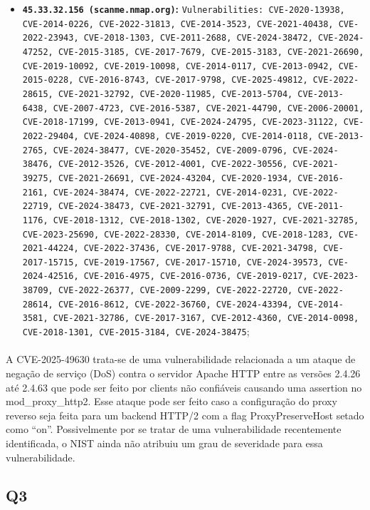 \documentclass[12pt]{article}
\begin{document}
\begin{itemize}
  \item \textbf{\texttt{45.33.32.156 (scanme.nmap.org)}:} \texttt{Vulnerabilities: CVE-2020-13938, CVE-2014-0226, CVE-2022-31813, CVE-2014-3523, CVE-2021-40438, CVE-2022-23943, CVE-2018-1303, CVE-2011-2688, CVE-2024-38472, CVE-2024-47252, CVE-2015-3185, CVE-2017-7679, CVE-2015-3183, CVE-2021-26690, CVE-2019-10092, CVE-2019-10098, CVE-2014-0117, CVE-2013-0942, CVE-2015-0228, CVE-2016-8743, CVE-2017-9798, CVE-2025-49812, CVE-2022-28615, CVE-2021-32792, CVE-2020-11985, CVE-2013-5704, CVE-2013-6438, CVE-2007-4723, CVE-2016-5387, CVE-2021-44790, CVE-2006-20001, CVE-2018-17199, CVE-2013-0941, CVE-2024-24795, CVE-2023-31122, CVE-2022-29404, CVE-2024-40898, CVE-2019-0220, CVE-2014-0118, CVE-2013-2765, CVE-2024-38477, CVE-2020-35452, CVE-2009-0796, CVE-2024-38476, CVE-2012-3526, CVE-2012-4001, CVE-2022-30556, CVE-2021-39275, CVE-2021-26691, CVE-2024-43204, CVE-2020-1934, CVE-2016-2161, CVE-2024-38474, CVE-2022-22721, CVE-2014-0231, CVE-2022-22719, CVE-2024-38473, CVE-2021-32791, CVE-2013-4365, CVE-2011-1176, CVE-2018-1312, CVE-2018-1302, CVE-2020-1927, CVE-2021-32785, CVE-2023-25690, CVE-2022-28330, CVE-2014-8109, CVE-2018-1283, CVE-2021-44224, CVE-2022-37436, CVE-2017-9788, CVE-2021-34798, CVE-2017-15715, CVE-2019-17567, CVE-2017-15710, CVE-2024-39573, CVE-2024-42516, CVE-2016-4975, CVE-2016-0736, CVE-2019-0217, CVE-2023-38709, CVE-2022-26377, CVE-2009-2299, CVE-2022-22720, CVE-2022-28614, CVE-2016-8612, CVE-2022-36760, CVE-2024-43394, CVE-2014-3581, CVE-2021-32786, CVE-2017-3167, CVE-2012-4360, CVE-2014-0098, CVE-2018-1301, CVE-2015-3184, CVE-2024-38475};
\end{itemize}

\paragraph{}

A CVE-2025-49630 trata-se de uma vulnerabilidade relacionada a um ataque de negação de serviço (DoS) contra o servidor
Apache HTTP entre as versões 2.4.26 até 2.4.63 que pode ser feito por clients não confiáveis causando uma assertion no
mod\_proxy\_http2. Esse ataque pode ser feito caso a configuração do proxy reverso seja feita para um backend HTTP/2 com a flag ProxyPreserveHost setado como “on”. Possivelmente por se tratar de uma vulnerabilidade recentemente identificada, o NIST ainda não atribuiu um grau de severidade para essa vulnerabilidade.

\subsection{Q3}
\end{document}
